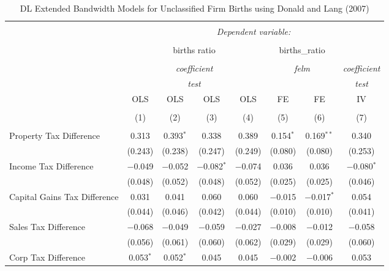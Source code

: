 
\begin{table}[!htbp] \centering 
  \caption{DL Extended Bandwidth Models for  Unclassified Firm Births using Donald and Lang (2007)} 
  \label{} 
\begin{tabular}{@{\extracolsep{5pt}}lccccccc} 
\\[-1.8ex]\hline 
\hline \\[-1.8ex] 
 & \multicolumn{7}{c}{\textit{Dependent variable:}} \\ 
\cline{2-8} 
\\[-1.8ex] & \multicolumn{4}{c}{births ratio} & \multicolumn{2}{c}{births\_ratio} &   \\ 
\\[-1.8ex] & \multicolumn{4}{c}{\textit{coefficient}} & \multicolumn{2}{c}{\textit{felm}} & \textit{coefficient} \\ 
 & \multicolumn{4}{c}{\textit{test}} & \multicolumn{2}{c}{\textit{}} & \textit{test} \\ 
 & OLS & OLS & OLS & OLS & FE & FE & IV \\ 
\\[-1.8ex] & (1) & (2) & (3) & (4) & (5) & (6) & (7)\\ 
\hline \\[-1.8ex] 
 Property Tax Difference & 0.313 & 0.393$^{*}$ & 0.338 & 0.389 & 0.154$^{*}$ & 0.169$^{**}$ & 0.340 \\ 
  & (0.243) & (0.238) & (0.247) & (0.249) & (0.080) & (0.080) & (0.253) \\ 
  Income Tax Difference & $-$0.049 & $-$0.052 & $-$0.082$^{*}$ & $-$0.074 & 0.036 & 0.036 & $-$0.080$^{*}$ \\ 
  & (0.048) & (0.052) & (0.048) & (0.052) & (0.025) & (0.025) & (0.046) \\ 
  Capital Gains Tax Difference & 0.031 & 0.041 & 0.060 & 0.060 & $-$0.015 & $-$0.017$^{*}$ & 0.054 \\ 
  & (0.044) & (0.046) & (0.042) & (0.044) & (0.010) & (0.010) & (0.041) \\ 
  Sales Tax Difference & $-$0.068 & $-$0.049 & $-$0.059 & $-$0.027 & $-$0.008 & $-$0.012 & $-$0.058 \\ 
  & (0.056) & (0.061) & (0.060) & (0.062) & (0.029) & (0.029) & (0.060) \\ 
  Corp Tax Difference & 0.053$^{*}$ & 0.052$^{*}$ & 0.045 & 0.045 & $-$0.002 & $-$0.006 & 0.053 \\ 

\end{tabular}
\end{table}
